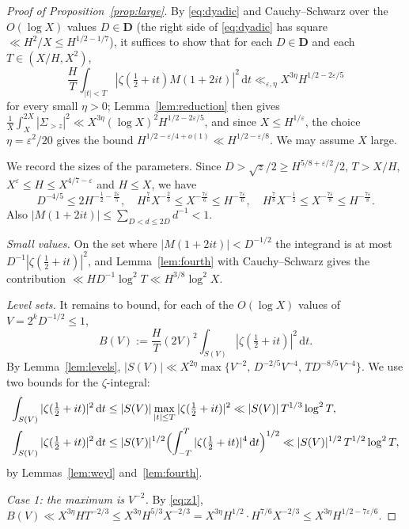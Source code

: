 \documentclass[11pt]{amsart}
\theoremstyle{remark}
\newcommand{\eps}{\varepsilon}
\newcommand{\dd}{\,\mathrm{d}}
\begin{document}
\begin{proof}[Proof of Proposition~\ref{prop:large}]
By \eqref{eq:dyadic} and Cauchy--Schwarz over the $O(\log X)$ values
$D\in\mathbf D$ (the right side of \eqref{eq:dyadic} has square
$\ll H^2/X\le H^{1/2-1/7}$), it suffices to show that for each $D\in\mathbf D$ and
each $T\in(X/H,X^2)$,
\begin{equation}\label{eq:goal}
  \frac HT\int_{|t|<T}|\zeta(\tfrac12+it)M(1+2it)|^2\dd t\ll_{\eps,\eta} X^{3\eta}H^{1/2-2\eps/5}
\end{equation}
for every small $\eta>0$; Lemma~\ref{lem:reduction} then gives
$\frac1X\int_X^{2X}|\Sigma_{>z}|^2\ll X^{3\eta}(\log X)^2H^{1/2-2\eps/5}$, and since
$X\le H^{1/\eps}$, the choice $\eta=\eps^2/20$ gives the bound
$H^{1/2-\eps/4+o(1)}\ll H^{1/2-\eps/8}$.  We may assume $X$ large.

We record the sizes of the parameters.  Since $D>\sqrt z/2\ge H^{5/8+\eps/2}/2$,
$T>X/H$, $X^\eps\le H\le X^{4/7-\eps}$ and $H\le X$, we have
\begin{equation}\label{eq:params}
  D^{-4/5}\le 2H^{-\frac12-\frac{2\eps}5},\quad
  H^{\frac76}X^{-\frac23}\le X^{-\frac{7\eps}6}\le H^{-\frac{7\eps}6},\quad
  H^{\frac78}X^{-\frac12}\le X^{-\frac{7\eps}8}\le H^{-\frac{7\eps}8}.
\end{equation}
Also $|M(1+2it)|\le\sum_{D<d\le2D}d^{-1}<1$.

\emph{Small values.}  On the set where $|M(1+2it)|<D^{-1/2}$ the integrand is at most
$D^{-1}|\zeta(\frac12+it)|^2$, and Lemma~\ref{lem:fourth} with Cauchy--Schwarz gives the contribution
$\ll HD^{-1}\log^2 T\ll H^{3/8}\log^2 X$.

\emph{Level sets.}  It remains to bound, for each of the $O(\log X)$ values of
$V=2^kD^{-1/2}\le1$,
\[
  B(V):=\frac HT(2V)^2\int_{S(V)}|\zeta(\tfrac12+it)|^2\dd t .
\]
By Lemma~\ref{lem:levels}, $|S(V)|\ll X^{2\eta}\max\{V^{-2},\,D^{-2/5}V^{-4},\,TD^{-8/5}V^{-4}\}$.
We use two bounds for the $\zeta$-integral:
\begin{align}
  \int_{S(V)}|\zeta(\tfrac12+it)|^2\dd t&\le|S(V)|\max_{|t|\le T}|\zeta(\tfrac12+it)|^2\ll|S(V)|\,T^{1/3}\log^2T,\label{eq:z1}\\
  \int_{S(V)}|\zeta(\tfrac12+it)|^2\dd t&\le|S(V)|^{1/2}\Bigl(\int_{-T}^T|\zeta(\tfrac12+it)|^4\dd t\Bigr)^{1/2}\ll|S(V)|^{1/2}\,T^{1/2}\log^2T,\label{eq:z2}
\end{align}
by Lemmas~\ref{lem:weyl} and~\ref{lem:fourth}.

\emph{Case 1: the maximum is $V^{-2}$.}  By \eqref{eq:z1},
$B(V)\ll X^{3\eta}HT^{-2/3}\le X^{3\eta}H^{5/3}X^{-2/3}=X^{3\eta}H^{1/2}\cdot H^{7/6}X^{-2/3}\le X^{3\eta}H^{1/2-7\eps/6}$.


\end{proof}
\end{document}
